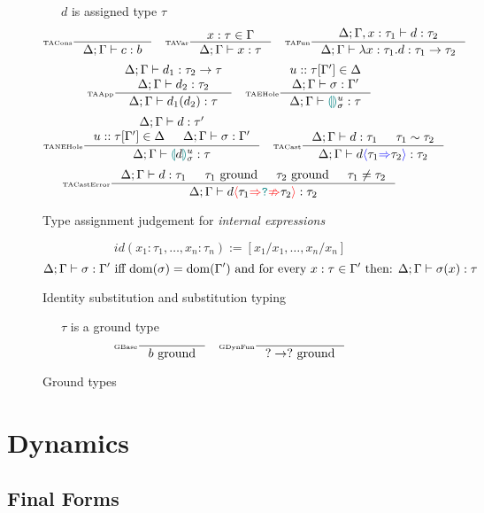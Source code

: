\begin{figure}[H]
\ \ \ $d$ is assigned type $\tau$
\[\inference[\tiny TACons]{}{\typeassignment{c}{b}}\quad
\inference[\tiny TAVar]{x : \tau \in \Gamma}{\typeassignment{x}{\tau}}\quad
\inference[\tiny TAFun]{\typeassignment[\Delta;\Gamma,x:\tau_1]{d}{\tau_2}}{\typeassignment{\lambda x:\tau_1. d}{\tau_1 \to \tau_2}}\]
\[\inference[\tiny TAApp]{\typeassignment{d_1}{\tau_2 \to \tau} \\ \typeassignment{d_2}{\tau_2}}{\typeassignment{d_1(d_2)}{\tau}} \quad 
\inference[\tiny TAEHole]{u :: \tau[\Gamma'] \in \Delta \\ \typeassignment{\sigma}{\Gamma'}}{\typeassignment{\hole^u_\sigma}{\tau}}\]
\[
\inference[\tiny TANEHole]{\typeassignment{d}{\tau'} \\ u :: \tau[\Gamma'] \in \Delta & \typeassignment{\sigma}{\Gamma'}}{\typeassignment{\hole[d]^u_\sigma}{\tau}}\quad 
\inference[\tiny TACast]{\typeassignment{d}{\tau_1} & \tau_1 \sim \tau_2}{\typeassignment{d\scast{\tau_1}{\tau_2}}{\tau_2}}\]
\[\inference[\tiny TACastError]{\typeassignment{d}{\tau_1} & \tau_1\text{ ground} & \tau_2\text{ ground} & \tau_1 \neq \tau_2}{\typeassignment{d\scasterror{\tau_1}{\tau_2}}{\tau_2}}\]
\caption{Type assignment judgement for \textit{internal expressions}}
\label{fig:typeassignment}
\end{figure}

\begin{figure}
\[id(x_1:\tau_1, \dots, x_n:\tau_n) := [x_1/x_1, \dots, x_n/x_n]\]
\[\Delta;\Gamma \vdash \sigma : \Gamma' \text{ iff } \mathrm{dom}(\sigma) = \mathrm{dom}(\Gamma')\text{ and for every } x : \tau \in \Gamma' \text{ then:
} \Delta;\Gamma \vdash \sigma(x) : \tau\]
\caption{Identity substitution and substitution typing}
\label{fig:substitutiontyping}
\end{figure}

\begin{figure}[h]
\ \ \ $\tau$ is a ground type
\[\inference[\tiny GBase]{}{b\text{ ground}}\quad \inference[\tiny GDynFun]{}{? \to ?\text{ ground}}\]
\caption{Ground types}
\label{fig:groundtypes}
\end{figure}

\section{Dynamics}

\subsection{Final Forms}

